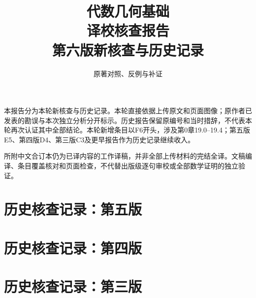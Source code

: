 
\newcommand{\RR}{\mathcal R}
\newcommand{\FF}{\mathcal F}
\newcommand{\GG}{\mathcal G}
\newcommand{\MM}{\mathcal M}
\newcommand{\JJ}{\mathcal J}
\newcommand{\oldauditsrc}[1]{\par\noindent\textbf{原文位置：}#1。\par}
\newcommand{\kind}[2]{\noindent\textbf{分类：#1。}\ #2\par}
\newcommand{\lead}[1]{\par\noindent\textbf{#1}\quad}
\newenvironment{analysisproof}{\par\noindent\textbf{该轮核查的反例或补证。}\ }{\par}

\title{代数几何基础\\译校核查报告\\[1em]\large 第六版新核查与历史记录}
\author{原著对照、反例与补证}
\date{}

\frontmatter
\maketitle
{}
本报告分为本轮新核查与历史记录。本轮直接依据上传原文和页面图像；原作者已发表的勘误与本次独立分析分开标示。历史报告保留原编号和当时措辞，不代表本轮再次认证其中全部结论。本轮新增条目以F6开头，涉及第0章19.0--19.4；第五版E5、第四版D4、第三版C3及更早报告作为历史记录继续收入。

所附中文合订本仍为已译内容的工作译稿，并非全部上传材料的完结全译。文稿编译、条目覆盖核对和页面检查，不代替出版级逐句审校或全部数学证明的独立验证。
\tableofcontents
\mainmatter

\part*{历史核查记录：第五版}

\part*{历史核查记录：第四版}

\part*{历史核查记录：第三版}

